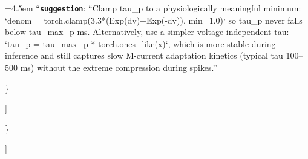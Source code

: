 \begin{tcolorbox}
\par\noindent\hangindent=4.5em \hspace*{3.0em}\hspace*{1.5em}``\textbf{\texttt{suggestion}}\textquotesingle\textquotesingle: ``Clamp tau\_p to a physiologically meaningful minimum: `denom = torch.clamp(3.3*(Exp(dv)+Exp(-dv)), min=1.0)` so tau\_p never falls below tau\_max\_p ms. Alternatively, use a simpler voltage-independent tau: `tau\_p = tau\_max\_p * torch.ones\_like(x)`, which is more stable during inference and still captures slow M-current adaptation kinetics (typical tau 100--500 ms) without the extreme compression during spikes.''
\par\noindent \hspace*{3.0em}\}
\par\noindent \hspace*{1.5em}]
\par\noindent \}
\smallskip
\par\noindent [[ \#\# completed \#\# ]]\\
\noindent
\smallskip
\end{tcolorbox}
\vspace{0.35em}


